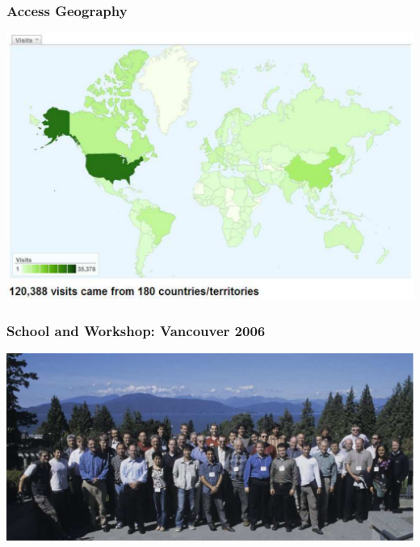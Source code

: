 \begin{frame}
  \MadLogo
  \frametitle{Access Geography}
\includegraphics[width=\textwidth]{Fig/map}  
\end{frame}

\begin{frame}
  \frametitle{School and Workshop: Vancouver 2006}
  \includegraphics[width=\textwidth]{Fig/RSF2006}
\end{frame}

